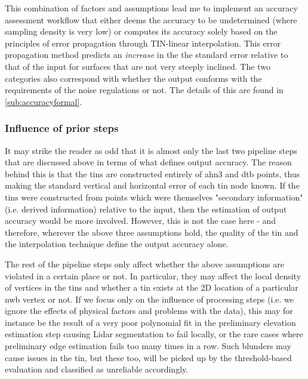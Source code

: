 This combination of factors and assumptions lead me to implement an accuracy assessment workflow that either deems the accuracy to be undetermined (where sampling density is very low) or computes its accuracy solely based on the principles of error propagation through TIN-linear interpolation. This error propagation method predicts an \textit{increase} in the the standard error relative to that of the input for surfaces that are not very steeply inclined. The two categories also correspond with whether the output conforms with the requirements of the noise regulations or not. The details of this are found in \ref{sub:accuracyformal}.

\subsubsection{Influence of prior steps}

It may strike the reader as odd that it is almost only the last two pipeline steps that are discussed above in terms of what defines output accuracy. The reason behind this is that the \ac{tin}s are constructed entirely of \ac{ahn3} and \ac{dtb} points, thus making the standard vertical and horizontal error of each \ac{tin} node known. If the \ac{tin}s were constructed from points which were themselves "secondary information" (i.e. derived information) relative to the input, then the estimation of output accuracy would be more involved. However, this is not the case here - and therefore, wherever the above three assumptions hold, the quality of the \ac{tin} and the interpolation technique define the output accuracy alone.

The rest of the pipeline steps only affect whether the above assumptions are violated in a certain place or not. In particular, they may affect the local density of vertices in the \ac{tin}s and whether a \ac{tin} exists at the 2D location of a particular \ac{nwb} vertex or not. If we focus only on the influence of processing steps (i.e. we ignore the effects of physical factors and problems with the data), this may for instance be the result of a very poor polynomial fit in the preliminary elevation estimation step causing Lidar segmentation to fail locally, or the rare cases where preliminary edge estimation fails too many times in a row. Such blunders may cause issues in the \ac{tin}, but these too, will be picked up by the threshold-based evaluation and classified as unreliable accordingly.

